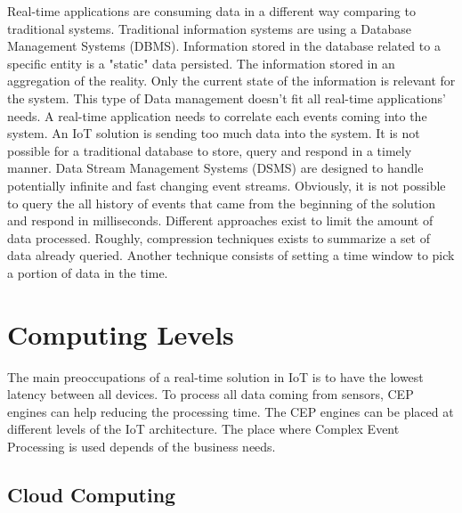 \documentclass[11pt]{article}
\begin{document}
Real-time applications are consuming data in a different way comparing to traditional systems. Traditional information systems are using a Database Management Systems (DBMS). Information stored in the database related to a specific entity is a "static" data persisted. The information stored in an aggregation of the reality. Only the current state of the information is relevant for the system. This type of Data management doesn't fit all real-time applications' needs. A real-time application needs to correlate each events coming into the system. An IoT solution is sending too much data into the system. It is not possible for a traditional database to store, query and respond in a timely manner. \cite{Complex-event-processing-for-the-Internet-of-Things}
\newline
\newline
Data Stream Management Systems (DSMS) are designed to handle potentially infinite and fast changing event streams. Obviously, it is not possible to query the all history of events that came from the beginning of the solution and respond in milliseconds. Different approaches exist to limit the amount of data processed. Roughly, compression techniques exists to summarize a set of data already queried. Another technique consists of setting a time window to pick a portion of data in the time. 


\section{Computing Levels} \label{computing-levels}

The main preoccupations of a real-time solution in IoT is to have the lowest latency between all devices. To process all data coming from sensors, CEP engines can help reducing the processing time. The CEP engines can be placed at different levels of the IoT architecture. The place where Complex Event Processing is used depends of the business needs. 


\subsection{Cloud Computing}
\end{document}
